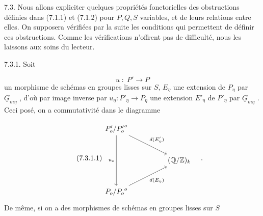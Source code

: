 7.3. Nous allons expliciter quelques propriétés fonctorielles des obstructions définies dans (7.1.1) et (7.1.2) pour $P,Q,S$ variables, et de leurs relations entre elles. On supposera vérifiées par la suite les conditions qui permettent de définir ces obstructions. Comme les vérifications n'offrent pas de difficulté, nous les laissons aux soins du lecteur.

7.3.1. Soit

\begin{equation*}
u \; : \; P' \longrightarrow P
\end{equation*}
un morphisme de schémas en groupes lisses sur $S$, $E_\eta$ une extension de $P_\eta$ par $\underline{G}_{m\eta}$ , d'où par image inverse par $u_\eta : P'_\eta \longrightarrow P_\eta$ une extension $E'_\eta$ de $P'_\eta$ par $\underline{G}_{m\eta}$ . Ceci posé, on a commutativité dans le diagramme 



\begin{equation}\tag{7.3.1.1}
\begin{tikzcd}[row sep=large, column sep=huge]
{P'_o/{P'_o}^{o}} \arrow[dd, "u_o"'] \arrow[rd, "d(E'_\eta)"] & \\
 & {(\mathbb{Q}/\mathbb{Z})_k} \\
{P_o/{P_o}^{o}} \arrow[ru, "d(E_\eta)"'] &
\end{tikzcd}\quad .
\end{equation}
De même, si on a des morphismes de schémas en groupes lisses sur $S$

